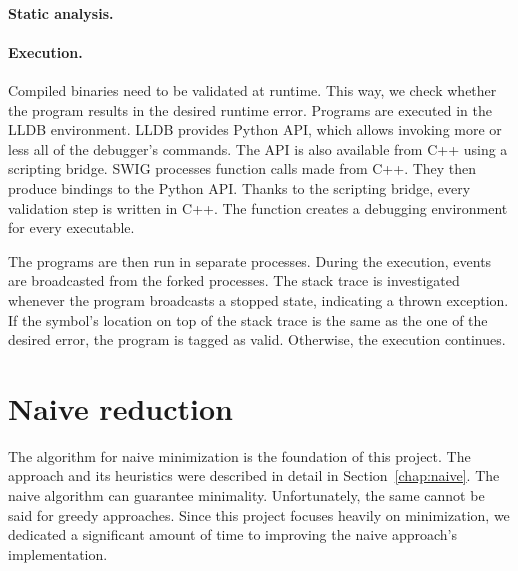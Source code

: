 \paragraph{Static analysis.}

\paragraph{Execution.} Compiled binaries need to be validated at runtime.
This way, we check whether the program results in the desired runtime error.
Programs are executed in the LLDB environment.
LLDB provides Python API, which allows invoking more or less all of 
the debugger's commands.
The API is also available from C++ using a scripting bridge.
SWIG processes function calls made from C++.
They then produce bindings to the Python API.
Thanks to the scripting bridge, every validation step is written in C++.
The  function creates a debugging environment for every 
executable.

The programs are then run in separate processes.
During the execution, events are broadcasted from the forked processes.
The stack trace is investigated whenever the program broadcasts a stopped 
state, indicating a thrown exception.
If the symbol's location on top of the stack trace is the same as the one of 
the desired error, the program is tagged as valid.
Otherwise, the execution continues.

\section{Naive reduction}\label{chap:naiveimplementation}

The algorithm for naive minimization is the foundation of this project. 
The approach and its heuristics were described in detail in 
Section~\ref{chap:naive}. 
The naive algorithm can guarantee minimality. Unfortunately, the same 
cannot be said for greedy approaches. 
Since this project focuses heavily on minimization, we dedicated 
a significant amount of time to improving the naive approach's 
implementation.


